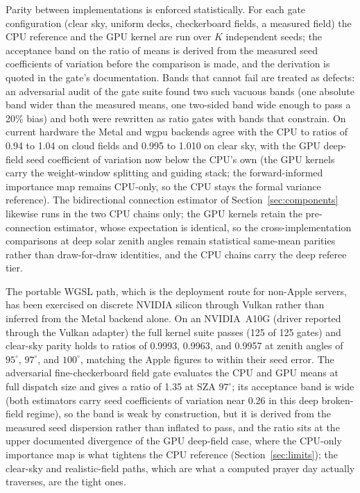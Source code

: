 \documentclass[preprint,12pt]{elsarticle}
\begin{document}
Parity between implementations is enforced statistically. For each gate
configuration (clear sky, uniform decks, checkerboard fields, a measured
field) the CPU reference and the GPU kernel are run over $K$ independent
seeds; the acceptance band on the ratio of means is derived from the
measured seed coefficients of variation before the comparison is made, and
the derivation is quoted in the gate's documentation. Bands that cannot
fail are treated as defects: an adversarial audit of the gate suite found
two such vacuous bands (one absolute band wider than the measured means,
one two-sided band wide enough to pass a 20\% bias) and both were
rewritten as ratio gates with bands that constrain. On current hardware the
Metal and wgpu backends agree with the CPU to ratios of 0.94 to 1.04 on
cloud fields and 0.995 to 1.010 on clear sky, with the GPU deep-field seed
coefficient of variation now below the CPU's own (the GPU kernels carry the
weight-window splitting and guiding stack; the forward-informed importance
map remains CPU-only, so the CPU stays the formal variance reference).
The bidirectional connection estimator of
Section~\ref{sec:components} likewise runs in the two CPU chains only;
the GPU kernels retain the pre-connection estimator, whose expectation is
identical, so the cross-implementation comparisons at deep solar zenith
angles remain statistical same-mean parities rather than draw-for-draw
identities, and the CPU chains carry the deep referee tier.

The portable WGSL path, which is the deployment route for non-Apple
servers, has been exercised on discrete NVIDIA silicon through Vulkan
rather than inferred from the Metal backend alone. On an NVIDIA~A10G
(driver reported through the Vulkan adapter) the full kernel suite passes
(125 of 125 gates) and clear-sky parity holds to ratios of 0.9993,
0.9963, and 0.9957 at zenith angles of $95^\circ$, $97^\circ$, and
$100^\circ$, matching the Apple figures to within their seed error. The
adversarial fine-checkerboard field gate evaluates the CPU and GPU means
at full dispatch size and gives a ratio of 1.35 at SZA $97^\circ$; its
acceptance band is wide (both estimators carry seed coefficients of
variation near 0.26 in this deep broken-field regime), so the band is
weak by construction, but it is derived from the measured seed dispersion
rather than inflated to pass, and the ratio sits at the upper documented
divergence of the GPU
deep-field case, where the CPU-only importance map is what tightens the
CPU reference (Section~\ref{sec:limits}); the clear-sky and
realistic-field paths, which are what a computed prayer day actually
traverses, are the tight ones.
\end{document}
